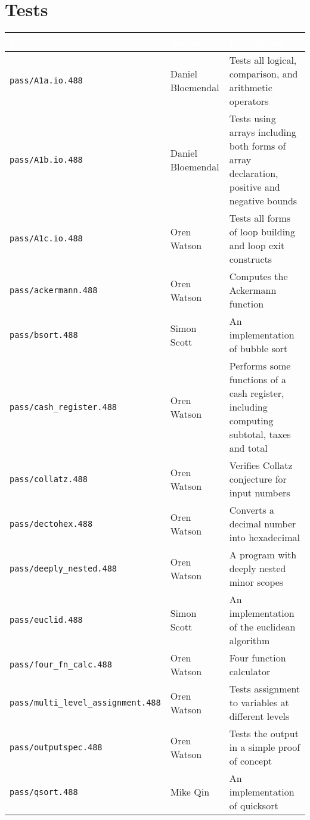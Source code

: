 \documentclass[oneside]{amsart}
\theoremstyle{definition}
\theoremstyle{remark}
\numberwithin{equation}{section}
\begin{document}
\section{Tests}
\begin{tabular}{l|l|p{8.5cm}}
\rowcolor{black!80}\textcolor{white}{\textbf{Test}} & \textcolor{white}{\textbf{Author}} & \textcolor{white}{\textbf{Description}} \\
\hline
\texttt{pass/A1a.io.488}                       & Daniel Bloemendal & Tests all logical, comparison, and arithmetic operators \\
\texttt{pass/A1b.io.488}                       & Daniel Bloemendal & Tests using arrays including both forms of array declaration, positive and negative bounds \\
\texttt{pass/A1c.io.488}                       & Oren Watson       & Tests all forms of loop building and loop exit constructs \\
\texttt{pass/ackermann.488}                    & Oren Watson       & Computes the Ackermann function \\
\texttt{pass/bsort.488}                        & Simon Scott       & An implementation of bubble sort \\
\texttt{pass/cash\_register.488}               & Oren Watson       & Performs some functions of a cash register, including computing subtotal, taxes and total \\
\texttt{pass/collatz.488}                      & Oren Watson       & Verifies Collatz conjecture for input numbers \\
\texttt{pass/dectohex.488}                     & Oren Watson       & Converts a decimal number into hexadecimal \\
\texttt{pass/deeply\_nested.488}               & Oren Watson       & A program with deeply nested minor scopes \\
\texttt{pass/euclid.488}                       & Simon Scott       & An implementation of the euclidean algorithm \\
\texttt{pass/four\_fn\_calc.488}               & Oren Watson       & Four function calculator \\
\texttt{pass/multi\_level\_assignment.488}     & Oren Watson       & Tests assignment to variables at different levels \\
\texttt{pass/outputspec.488}                   & Oren Watson       & Tests the output in a simple proof of concept \\
\texttt{pass/qsort.488}                        & Mike Qin          & An implementation of quicksort \\

\end{tabular}
\end{document}
